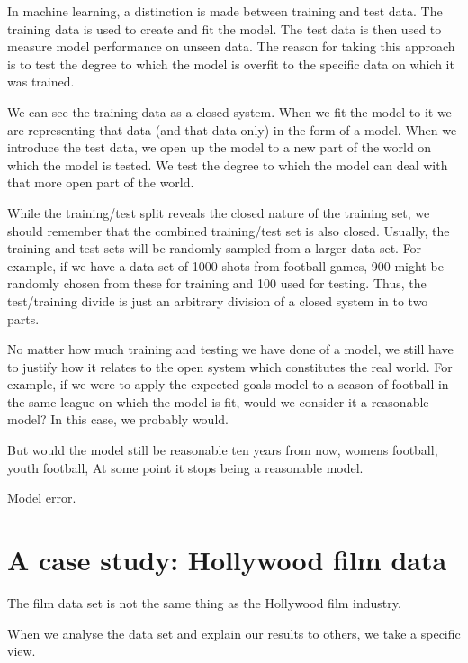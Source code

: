 In machine learning, a distinction is made between training and test data. The training data is used to create and fit the model. The test data is then used to measure model performance on unseen data. The reason for taking this approach is to test the degree to which the model is overfit to the specific data on which it was trained. 

We can see the training data as a closed system. When we fit the model to it we are representing that data (and that data only) in the form of a model. When we introduce the test data, we open up the model to a new part of the world on which the model is tested. We test the degree to which the model can deal with that more open part of the world.

While the training/test split reveals the closed nature of the training set, we should remember that the combined training/test set is also closed. Usually, the training and test sets will be randomly sampled from a larger data set. For example, if we have a data set of 1000 shots from football games, 900 might be randomly chosen from these for training and 100 used for testing. Thus, the test/training divide is just an arbitrary division of a closed system in to two parts. 


No matter how much training and testing we have done of a model, we still have to justify how it relates to the open system which constitutes the real world. For example, if we were to apply the expected goals model to a season of football in the same league on which the model is fit, would we consider it a reasonable model? In this case, we probably would.

But would the model still be reasonable ten years from now, 
womens football, youth football, At some point it stops being a reasonable model. 

Model error. 



\cite{waldrop2022beyond}



\section{A case study: Hollywood film data}



The film data set is not the same thing as the Hollywood film industry. 



When we analyse the data set and explain our results to others, we take a specific view. 


